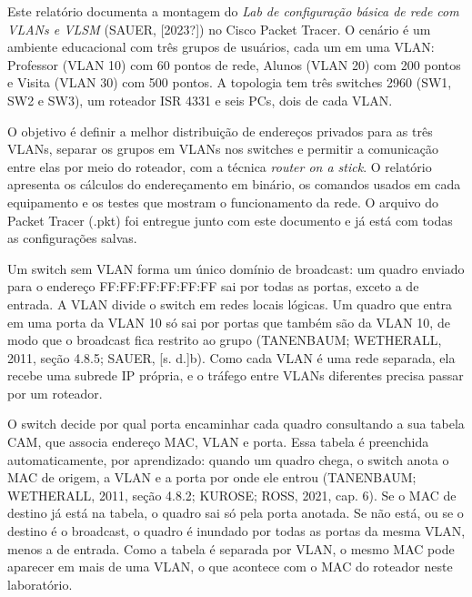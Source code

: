 
Este relatório documenta a montagem do \emph{Lab de configuração básica de rede com VLANs e VLSM} (SAUER, [2023?]) no Cisco Packet Tracer. O cenário é um ambiente educacional com três grupos de usuários, cada um em uma VLAN: Professor (VLAN 10) com 60 pontos de rede, Alunos (VLAN 20) com 200 pontos e Visita (VLAN 30) com 500 pontos. A topologia tem três switches 2960 (SW1, SW2 e SW3), um roteador ISR 4331 e seis PCs, dois de cada VLAN.

O objetivo é definir a melhor distribuição de endereços privados para as três VLANs, separar os grupos em VLANs nos switches e permitir a comunicação entre elas por meio do roteador, com a técnica \emph{router on a stick}. O relatório apresenta os cálculos do endereçamento em binário, os comandos usados em cada equipamento e os testes que mostram o funcionamento da rede. O arquivo do Packet Tracer (.pkt) foi entregue junto com este documento e já está com todas as configurações salvas.



Um switch sem VLAN forma um único domínio de broadcast: um quadro enviado para o endereço FF:FF:FF:FF:FF:FF sai por todas as portas, exceto a de entrada. A VLAN divide o switch em redes locais lógicas. Um quadro que entra em uma porta da VLAN 10 só sai por portas que também são da VLAN 10, de modo que o broadcast fica restrito ao grupo (TANENBAUM; WETHERALL, 2011, seção 4.8.5; SAUER, [s. d.]b). Como cada VLAN é uma rede separada, ela recebe uma subrede IP própria, e o tráfego entre VLANs diferentes precisa passar por um roteador.


O switch decide por qual porta encaminhar cada quadro consultando a sua tabela CAM, que associa endereço MAC, VLAN e porta. Essa tabela é preenchida automaticamente, por aprendizado: quando um quadro chega, o switch anota o MAC de origem, a VLAN e a porta por onde ele entrou (TANENBAUM; WETHERALL, 2011, seção 4.8.2; KUROSE; ROSS, 2021, cap. 6). Se o MAC de destino já está na tabela, o quadro sai só pela porta anotada. Se não está, ou se o destino é o broadcast, o quadro é inundado por todas as portas da mesma VLAN, menos a de entrada. Como a tabela é separada por VLAN, o mesmo MAC pode aparecer em mais de uma VLAN, o que acontece com o MAC do roteador neste laboratório.

